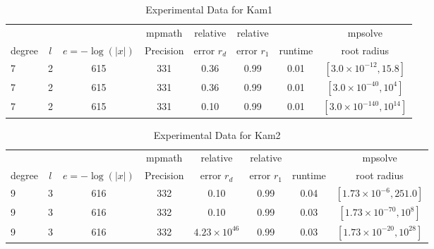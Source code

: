 \documentclass[sigconf]{acmart}
\begin{document}
\begin{table}[t]
\caption{Experimental Data for Kam1}
\label{tab:kam1}
\vskip 0.15in
\begin{center}
\begin{small}
\begin{sc}
\begin{tabular}{lccccccc}
\toprule
&  &  & mpmath & relative  & relative &  & mpsolve \\
degree  & $l$& $e=-\log(|x|)$& Precision &error $r_d$       & error $r_1$ &runtime& root radius\\
\midrule
   7 & 2 & 615 & 331 & 0.36 & 0.99 & 0.01 & $[3.0 \times 10^{-12}, 15.8]$ \\
   7 & 2 & 615 & 331 & 0.36 & 0.99 & 0.01 & $[3.0 \times 10^{-40}, 10^4]$\\
   7 & 2 & 615 & 331 & 0.10 & 0.99 & 0.01 & $[3.0 \times 10^{-140}, 10^{14}]$\\
\bottomrule
\end{tabular}
\end{sc}
\end{small}
\end{center}
\vskip -0.1in
\end{table}

\begin{table}[t]
\caption{Experimental Data for Kam2}
\label{tab:kam2}
\vskip 0.15in
\begin{center}
\begin{small}
\begin{sc}
\begin{tabular}{lccccccc}
\toprule
&  &  & mpmath & relative  & relative &  & mpsolve \\
degree  & $l$& $e=-\log(|x|)$& Precision &error $r_d$       & error $r_1$ &runtime& root radius\\
\midrule
   9 & 3 & 616 & 332 & 0.10 & 0.99 & 0.04 & $[1.73 \times 10^{-6},251.0]$ \\
   9 & 3 & 616 & 332 & 0.10 & 0.99 & 0.03 & $[1.73 \times 10^{-70},10^{8}]$\\
   9 & 3 & 616 & 332 & $4.23 \times 10^{46}$ & 0.99 & 0.03 & $[1.73 \times 10^{-20},10^{28}]$\\ %
\bottomrule
\end{tabular}
\end{sc}
\end{small}
\end{center}
\vskip -0.1in
\end{table}
\end{document}
